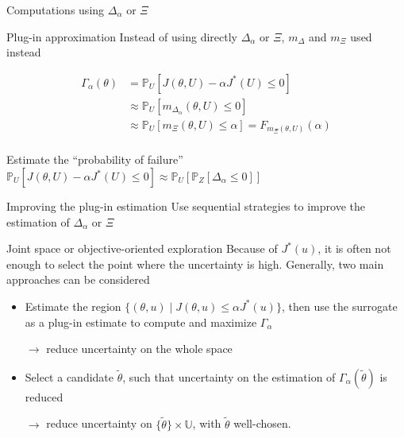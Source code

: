 \documentclass[10pt,aspectratio=169,usepdftitle=false]{beamer}
\newcommand{\Uspace}{\mathbb{U}}
\newcommand{\Prob}{\mathbb{P}}
\newcommand{\kk}{\theta}
\newcommand{\uu}{u}
\newcommand{\UU}{U}
\begin{document}
\begin{frame}{Computations using $\Delta_{\alpha}$ or $\Xi$}
  \begin{block}{Plug-in approximation}
    Instead of using directly $\Delta_{\alpha}$ or $\Xi$, $m_\Delta$ and $m_{\Xi}$ used instead
  \end{block}

  \begin{align}
      \Gamma_{\alpha}(\kk) &= \Prob_{\UU}\left[J(\kk, \UU) - \alpha J^*(\UU) \leq 0\right] \\
                              &\approx \Prob_{\UU}\left[m_{\Delta_{\alpha}}(\kk, \UU) \leq 0 \right] \\
                              &\approx \Prob_{\UU}\left[m_\Xi(\kk, \UU) \leq \alpha \right]=F_{m_{\Xi}(\kk,\UU)}(\alpha)  \\
  \end{align}
  
  Estimate the ``probability of
  failure''~\cite{bect_sequential_2012,echard_ak-mcs_2011}
  $\Prob_{\UU}\left[J(\kk, \UU) - \alpha J^*(\UU) \leq 0\right]
  \approx \Prob_{\UU}\left[\Prob_Z\left[\Delta_{\alpha} \leq
      0\right]\right]$
\end{frame}

\begin{frame}{Improving the plug-in estimation}
  Use sequential strategies to improve the estimation of $\Delta_{\alpha}$ or $\Xi$
\end{frame}

\begin{frame}{Joint space or objective-oriented exploration}
  Because of $J^*(\uu)$, it is often not enough to select the point
  where the uncertainty is high.  Generally, two main approaches can
  be considered
  \begin{itemize}
  \item Estimate the region
    $\{(\kk, \uu) \mid J(\kk,\uu) \leq \alpha J^*(\uu)\}$, then use
    the surrogate as a plug-in estimate to compute and maximize
    $\Gamma_{\alpha}$

    $\rightarrow$ reduce uncertainty on the whole space
  \item Select a candidate $\tilde{\kk}$, such that uncertainty on the
    estimation of $\Gamma_{\alpha}(\tilde{\kk})$ is reduced

    $\rightarrow$ reduce uncertainty on
    $\{\tilde{\kk}\}\times\Uspace$, with $\tilde{\kk}$ well-chosen.
  \end{itemize}
\end{frame}
\end{document}
